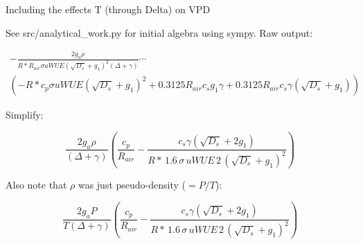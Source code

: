 
\usepackage{graphics, graphicx}
\graphicspath{ {./} } %


\begin{center}
\large{Including the effects T (through Delta) on VPD}\end{center}

\bigskip

See src/analytical\_work.py for initial algebra using sympy. Raw output:

\begin{multline}
  - \frac{2 g_{a} \rho}{R* R_{air} \sigma uWUE \left(\sqrt{D_{s}} + g_{1}\right)^{2} \left(\Delta + \gamma\right)}\cdots \\
  \left(- R* c_{p} \sigma uWUE \left(\sqrt{D_{s}} + g_{1}\right)^{2} + 0.3125 R_{air} c_{s} g_{1} \gamma + 0.3125 R_{air} c_{s} \gamma \left(\sqrt{D_{s}} + g_{1}\right)\right)
\end{multline}

Simplify:

\begin{equation}
\frac{ 2 g_{a} \rho}{\left(\Delta + \gamma\right)}  \left(\frac{c_{p}}{R_{air}} - \frac{ c_{s} \gamma  \left(\sqrt{D_{s}} + 2 g_{1}\right)}{R* \, 1.6 \, \sigma \, uWUE \, 2 \, \left(\sqrt{D_{s}} + g_{1}\right)^{2}}\right)
\end{equation}

Also note that $\rho$ was just pseudo-density ($=P/T$):

\begin{equation}
\frac{ 2 g_{a} P }{ T \left(\Delta + \gamma\right)}  \left(\frac{c_{p}}{R_{air}} - \frac{ c_{s} \gamma  \left(\sqrt{D_{s}} + 2 g_{1}\right)}{R* \, 1.6 \, \sigma \, uWUE \, 2 \, \left(\sqrt{D_{s}} + g_{1}\right)^{2}}\right)
\end{equation}


